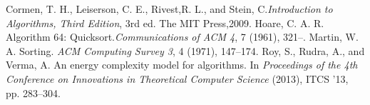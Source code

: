 \documentclass[12pt,twocolumn]{article}
\begin{document}
\begin{thebibliography}{}
Cormen, T. H., Leiserson, C. E., Rivest,R. L., and Stein, C.\textit{Introduction to Algorithms, Third Edition}, 3rd ed. The MIT Press,2009.
Hoare, C. A. R. Algorithm 64: Quicksort.\textit{Communications of ACM 4}, 7 (1961), 321–.
Martin, W. A. Sorting. \textit{ACM Computing Survey 3}, 4 (1971), 147–174.
Roy, S., Rudra, A., and Verma, A. An energy complexity model for algorithms. In \textit{Proceedings of the 4th Conference on Innovations in Theoretical Computer Science} (2013), ITCS ’13, pp. 283–304.
\end{thebibliography}
  
  
\end{document}
